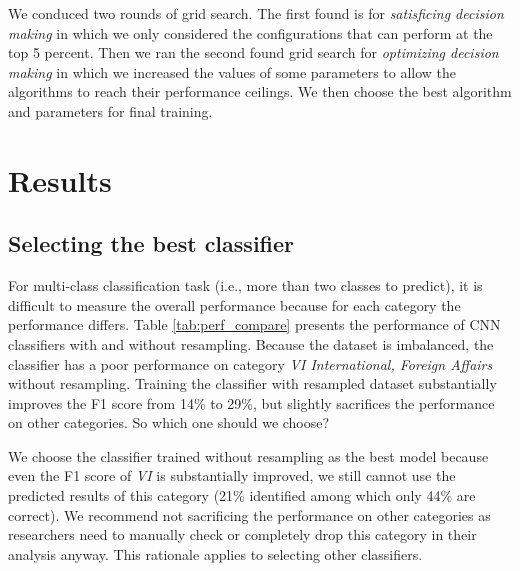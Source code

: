 \documentclass[11pt]{article}
\begin{document}
We conduced two rounds of grid search. The first found is for \textit{satisficing decision making} in which we only considered the configurations that can perform at the top 5 percent. Then we ran the second found grid search for \textit{optimizing decision making} in which we increased the values of some parameters to allow the algorithms to reach their performance ceilings. We then choose the best algorithm and parameters for final training.


\section{Results}


\subsection{Selecting the best classifier}

For multi-class classification task (i.e., more than two classes to predict), it is difficult to measure the overall performance because for each category the performance differs. Table \ref{tab:perf_compare} presents the performance of CNN classifiers with and without resampling. Because the dataset is imbalanced, the classifier has a poor performance on category \textit{VI International, Foreign Affairs} without resampling. Training the classifier with resampled dataset substantially improves the F1 score from 14\% to 29\%, but slightly sacrifices the performance on other categories. So which one should we choose?

We choose the classifier trained without resampling as the best model because even the F1 score of \textit{VI} is substantially improved, we still cannot use the predicted results of this category (21\% identified among which only 44\% are correct). We recommend not sacrificing the performance on other categories as researchers need to manually check or completely drop this category in their analysis anyway. This rationale applies to selecting other classifiers.
\end{document}
